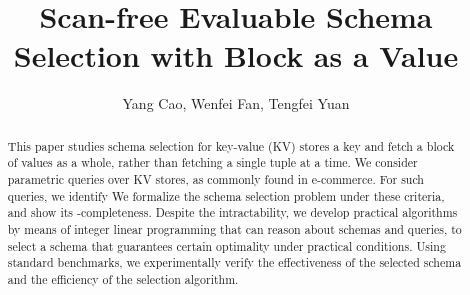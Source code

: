 \documentclass[sigconf]{acmart}
\title{{Scan-free Evaluable Schema Selection with Block as a Value}}
\author{Yang Cao, Wenfei Fan, Tengfei Yuan}
\affiliation{%
  \institution{
    University of Edinburgh
}}
\begin{document}
\date{}

\begin{abstract}
  This paper studies schema selection for key-value (KV) stores
   a key and fetch a block of values as a whole, rather
  than fetching a single tuple at a time.
  We consider parametric \SQL queries over KV
  stores, as commonly found in e-commerce. For such queries,
  we identify 
  We formalize the schema selection problem under these criteria,
  and show its \NP-completeness. Despite the intractability, 
  we develop practical algorithms by means of integer linear
  programming that can reason about \baav schemas and queries,
  to select a schema that guarantees
  certain optimality under practical conditions.
  Using standard %
  benchmarks,
  we experimentally verify the
  effectiveness of the selected schema and the efficiency of the
  selection algorithm.
\end{abstract}

\maketitle









\newpage



\end{document}
